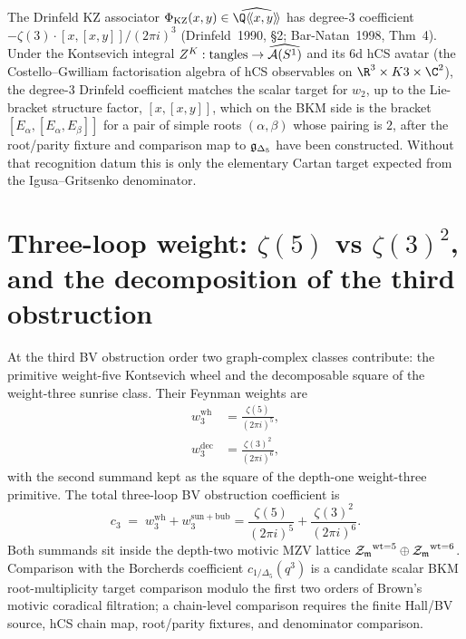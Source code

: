 \begin{remark}
\label{rem:drinfeld-associator-two-loop}
The Drinfeld KZ associator $\Phi_{\mathrm{KZ}}(x,y) \in \widehat{\Q
\langle\!\langle x, y\rangle\!\rangle}$ has degree-$3$ coefficient
$-\zeta(3)\cdot[x,[x,y]]/(2\pi i)^3$ (Drinfeld~1990, \S2;
Bar-Natan~1998, Thm~4). Under the Kontsevich integral
$Z^K: \text{tangles}\to \widehat{\mathcal{A}(S^1)}$ and its 6d hCS avatar (the
Costello--Gwilliam factorisation algebra of hCS observables on
$\R^3\times K3\times \C^2$), the degree-3 Drinfeld coefficient
matches the scalar target for \(w_2\), up to the Lie-bracket structure factor,
$[x,[x,y]]$, which on the BKM side is the bracket
$[E_\alpha, [E_\alpha, E_\beta]]$ for a pair of simple roots
$(\alpha,\beta)$ whose pairing is $2$, after the root/parity fixture and
comparison map to \(\mathfrak{g}_{\Delta_5}\) have been constructed. Without
that recognition datum this is only the elementary Cartan target expected
from the Igusa--Gritsenko denominator.
\end{remark}

\section{Three-loop weight: $\zeta(5)$ vs $\zeta(3)^2$, and the
decomposition of the third obstruction}
\label{sec:6d-hcs-three-loop}

\begin{theorem}
\label{thm:6d-hcs-three-loop-coefficient}
At the third BV obstruction order two graph-complex classes contribute:
the primitive weight-five Kontsevich wheel and the decomposable square
of the weight-three sunrise class. Their
Feynman weights are
\begin{align}
\label{eq:three-loop-weight-wheel}
w_3^{\mathrm{wh}}
&= \frac{\zeta(5)}{(2\pi i)^5},
\\
\label{eq:three-loop-weight-sunplus}
w_3^{\mathrm{dec}}
&= \frac{\zeta(3)^2}{(2\pi i)^6},
\end{align}
with the second summand kept as the square of the depth-one
weight-three primitive. The total three-loop BV obstruction
coefficient is
\[
c_3 \;=\; w_3^{\mathrm{wh}} + w_3^{\mathrm{sun+bub}}
= \frac{\zeta(5)}{(2\pi i)^5}
+ \frac{\zeta(3)^2}{(2\pi i)^6}.
\]
Both summands sit inside the depth-two motivic MZV lattice
${\mathcal{Z}_{\mathfrak m}}^{\mathrm{wt}=5}\oplus{\mathcal{Z}_{\mathfrak m}}^{\mathrm{wt}=6}$. Comparison with
the Borcherds coefficient $c_{1/\Delta_5}(q^3)$ is a candidate scalar
BKM root-multiplicity target comparison modulo the first two orders of
Brown's motivic coradical filtration; a chain-level comparison requires
the finite Hall/BV source, hCS chain map, root/parity fixtures, and
denominator comparison.
\end{theorem}

